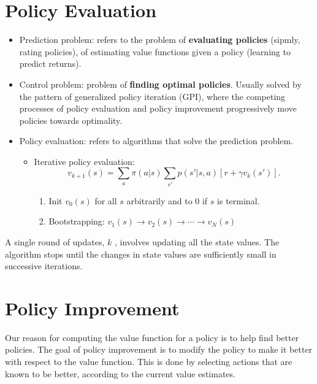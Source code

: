 \section{Policy Evaluation}
\begin{itemize}
	\item Prediction problem: refers to the problem of \textbf{evaluating policies} (sipmly, rating policies), of estimating value functions given a policy (learning to predict returns).
	\item Control problem: problem of \textbf{finding optimal policies}. Usually solved by the pattern of generalized policy iteration (GPI), where the competing processes of policy evaluation and policy improvement progressively move policies towards optimality.
	\item Policy evaluation: refers to algorithms that solve the prediction problem.
		\begin{itemize}
			\item Iterative policy evaluation:
				$$v_{k+1}(s)=\sum_{a}\pi(a|s)\sum_{s'}p(s'|s,a)[r + \gamma v_k(s')].$$ 
				\begin{enumerate}
					\item Init $v_0(s)$ for all $s$ arbitrarily and to 0 if $s$ is terminal. 
					\item Bootstrapping: $v_1(s)\to v_2(s)\to\cdots\to v_N(s)$
				\end{enumerate}
		\end{itemize}
\end{itemize}

A single round of updates, $k$ , involves updating all the state values. The algorithm stops until 
the changes in state values are sufficiently small in successive iterations.


\section{Policy Improvement}
Our reason for computing the value function for a policy is to help find better policies. The goal of policy improvement is to modify the policy to make it better with respect to the value function. This is done by selecting actions that are known to be better, according to the current value estimates.

